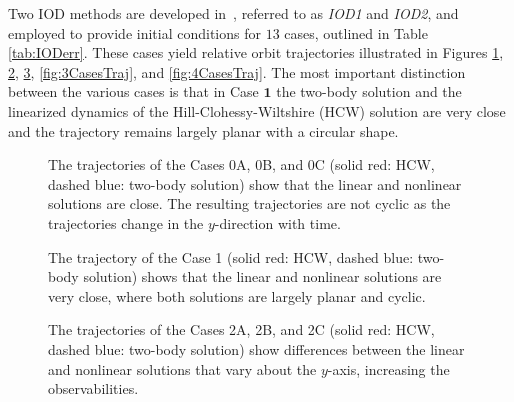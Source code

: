 \documentclass[letterpaper, paper,10pt]{AAS}		%
\begin{document}
Two IOD methods are developed in~\cite{NewLovPra14,PraLovNew14}, referred to as \emph{IOD1} and \emph{IOD2}, and employed to provide initial conditions for $13$ cases, outlined in Table \ref{tab:IODerr}.
These cases yield relative orbit trajectories illustrated in Figures \ref{fig:0CasesTraj}, \ref{fig:1CasesTraj}, \ref{fig:2CasesTraj}, \ref{fig:3CasesTraj}, and \ref{fig:4CasesTraj}.
The most important distinction between the various cases is that in Case $\mathbf{1}$ the two-body solution and the linearized dynamics of the Hill-Clohessy-Wiltshire (HCW) solution are very close and the trajectory remains largely planar with a circular shape.

\begin{figure}[h]
\centerline{
	\hfill
	\hfill
}
\caption{The trajectories of the Cases 0A, 0B, and 0C (solid red: HCW, dashed blue: two-body solution) show that the linear and nonlinear solutions are close.
The resulting trajectories are not cyclic as the trajectories change in the $y$-direction with time.}
\label{fig:0CasesTraj}
\end{figure}

\begin{figure}[h]
\label{fig:CaseTraj}
\centerline{
}
\caption{The trajectory of the Case 1 (solid red: HCW, dashed blue: two-body solution) shows that the linear and nonlinear solutions are very close, where both solutions are largely planar and cyclic.}
\label{fig:1CasesTraj}
\end{figure}


\begin{figure}[h]
\centerline{
	\hfill
	\hfill
}
\caption{The trajectories of the Cases 2A, 2B, and 2C (solid red: HCW, dashed blue: two-body solution) show differences between the linear and nonlinear solutions that vary about the $y$-axis, increasing the observabilities.}
\label{fig:2CasesTraj}
\end{figure}
\end{document}
